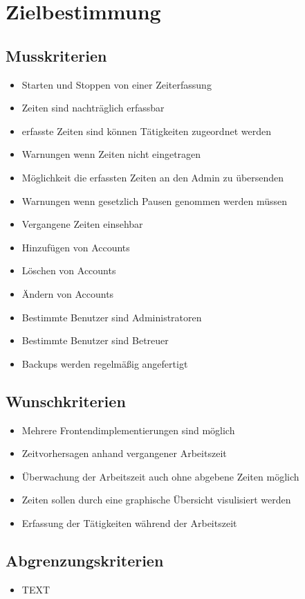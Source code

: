 \section{Zielbestimmung}

\subsection{Musskriterien}

\begin{itemize}
	\item Starten und Stoppen von einer Zeiterfassung
	\item Zeiten sind nachträglich erfassbar
	\item erfasste Zeiten sind können Tätigkeiten zugeordnet werden
	\item Warnungen wenn Zeiten nicht eingetragen
	\item Möglichkeit die erfassten Zeiten an den Admin zu übersenden
	\item Warnungen wenn gesetzlich Pausen genommen werden müssen
	\item Vergangene Zeiten einsehbar
	\item Hinzufügen von Accounts
	\item Löschen von Accounts
	\item Ändern von Accounts
	\item Bestimmte Benutzer sind Administratoren
	\item Bestimmte Benutzer sind Betreuer
	\item Backups werden regelmäßig angefertigt
\end{itemize}


\subsection{Wunschkriterien}

\begin{itemize}
	\item Mehrere Frontendimplementierungen sind möglich
	\item Zeitvorhersagen anhand vergangener Arbeitszeit
	\item Überwachung der Arbeitszeit auch ohne abgebene Zeiten möglich
	\item Zeiten sollen durch eine graphische Übersicht visulisiert werden
	\item Erfassung der Tätigkeiten während der Arbeitszeit

\end{itemize}


\subsection{Abgrenzungskriterien}
\begin{itemize}
	\item TEXT
\end{itemize}